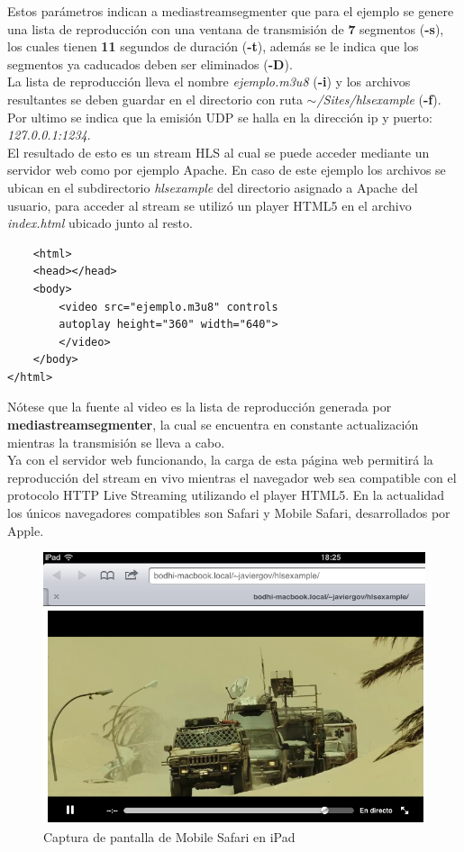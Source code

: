 Estos parámetros indican a mediastreamsegmenter que para el ejemplo se genere una lista de reproducción con una ventana de transmisión de \textbf{7} segmentos (\textbf{-s}), los cuales tienen \textbf{11} segundos de duración (\textbf{-t}), además se le indica que los segmentos ya caducados deben ser eliminados (\textbf{-D}). \\

La lista de reproducción lleva el nombre \textit{ejemplo.m3u8} (\textbf{-i}) y los archivos resultantes se deben guardar en el directorio con ruta \textit{$\sim$/Sites/hlsexample} (\textbf{-f}). Por ultimo se indica que la emisión UDP se halla en la dirección ip y puerto: \textit{127.0.0.1:1234}.\\

El resultado de esto es un stream HLS al cual se puede acceder mediante un servidor web como por ejemplo Apache. En caso de este ejemplo los archivos se ubican en el subdirectorio \textit{hlsexample} del directorio asignado a Apache del usuario, para acceder al stream se utilizó un player HTML5 en el archivo \textit{index.html} ubicado junto al resto.

 \begin{lstlisting}
	<html>
	<head></head>
	<body>
		<video src="ejemplo.m3u8" controls 
		autoplay height="360" width="640">
		</video>
	</body>
</html>\end{lstlisting}

Nótese que la fuente al video es la lista de reproducción generada por \textbf{mediastreamsegmenter}, la cual se encuentra en constante actualización mientras la transmisión se lleva a cabo.\\

Ya con el servidor web funcionando, la carga de esta página web permitirá la reproducción del stream en vivo mientras el navegador web sea compatible con el protocolo HTTP Live Streaming utilizando el player HTML5. En la actualidad los únicos navegadores compatibles son Safari y Mobile Safari, desarrollados por Apple.\\
\begin{figure}[H]
	\centering
	\includegraphics[scale=0.6]{imgs/ipad-hlsexample.png}
	\caption{Captura de pantalla de Mobile Safari en iPad}
	\label{ipad-hlsexample}	
\end{figure}

